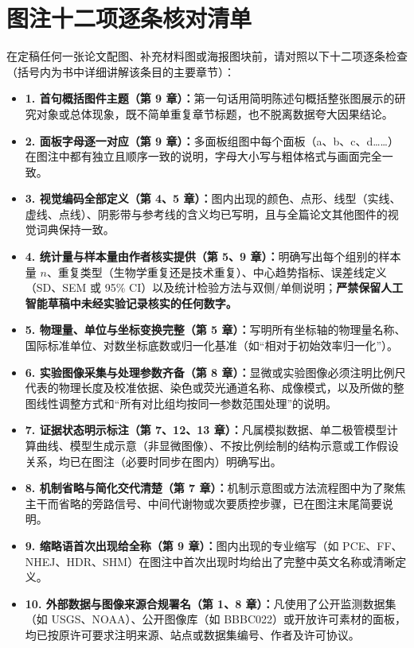 \section{图注十二项逐条核对清单}

在定稿任何一张论文配图、补充材料图或海报图块前，请对照以下十二项逐条检查（括号内为书中详细讲解该条目的主要章节）：

\begin{itemize}
  \item[$\square$] \textbf{1. 首句概括图件主题（第 9 章）：}第一句话用简明陈述句概括整张图展示的研究对象或总体现象，既不简单重复章节标题，也不脱离数据夸大因果结论。
  \item[$\square$] \textbf{2. 面板字母逐一对应（第 9 章）：}多面板组图中每个面板（a、b、c、d……）在图注中都有独立且顺序一致的说明，字母大小写与粗体格式与画面完全一致。
  \item[$\square$] \textbf{3. 视觉编码全部定义（第 4、5 章）：}图内出现的颜色、点形、线型（实线、虚线、点线）、阴影带与参考线的含义均已写明，且与全篇论文其他图件的视觉词典保持一致。
  \item[$\square$] \textbf{4. 统计量与样本量由作者核实提供（第 5、9 章）：}明确写出每个组别的样本量 $n$、重复类型（生物学重复还是技术重复）、中心趋势指标、误差线定义（SD、SEM 或 95\% CI）以及统计检验方法与双侧/单侧说明；\textbf{严禁保留人工智能草稿中未经实验记录核实的任何数字。}
  \item[$\square$] \textbf{5. 物理量、单位与坐标变换完整（第 5 章）：}写明所有坐标轴的物理量名称、国际标准单位、对数坐标底数或归一化基准（如“相对于初始效率归一化”）。
  \item[$\square$] \textbf{6. 实验图像采集与处理参数齐备（第 8 章）：}显微或实验图像必须注明比例尺代表的物理长度及校准依据、染色或荧光通道名称、成像模式，以及所做的整图线性调整方式和“所有对比组均按同一参数范围处理”的说明。
  \item[$\square$] \textbf{7. 证据状态明示标注（第 7、12、13 章）：}凡属模拟数据、单二极管模型计算曲线、模型生成示意（非显微图像）、不按比例绘制的结构示意或工作假设关系，均已在图注（必要时同步在图内）明确写出。
  \item[$\square$] \textbf{8. 机制省略与简化交代清楚（第 7 章）：}机制示意图或方法流程图中为了聚焦主干而省略的旁路信号、中间代谢物或次要质控步骤，已在图注末尾简要说明。
  \item[$\square$] \textbf{9. 缩略语首次出现给全称（第 9 章）：}图内出现的专业缩写（如 PCE、FF、NHEJ、HDR、SHM）在图注中首次出现时均给出了完整中英文名称或清晰定义。
  \item[$\square$] \textbf{10. 外部数据与图像来源合规署名（第 1、8 章）：}凡使用了公开监测数据集（如 USGS、NOAA）、公开图像库（如 BBBC022）或开放许可素材的面板，均已按原许可要求注明来源、站点或数据集编号、作者及许可协议。

\end{itemize}
